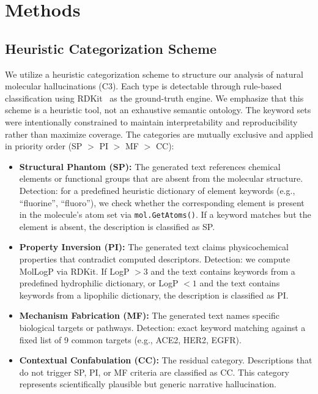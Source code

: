 \section{Methods}
\label{sec:methods}

\subsection{Heuristic Categorization Scheme}
We utilize a heuristic categorization scheme to structure our analysis of natural molecular hallucinations (C3). Each type is detectable through rule-based classification using RDKit~\cite{landrum2023rdkit} as the ground-truth engine. We emphasize that this scheme is a heuristic tool, not an exhaustive semantic ontology. The keyword sets were intentionally constrained to maintain interpretability and reproducibility rather than maximize coverage. The categories are mutually exclusive and applied in priority order (SP $>$ PI $>$ MF $>$ CC):

\begin{itemize}
    \item \textbf{Structural Phantom (SP):} The generated text references chemical elements or functional groups that are absent from the molecular structure. Detection: for a predefined heuristic dictionary of element keywords (e.g., ``fluorine'', ``fluoro''), we check whether the corresponding element is present in the molecule's atom set via \texttt{mol.GetAtoms()}. If a keyword matches but the element is absent, the description is classified as SP.
    \item \textbf{Property Inversion (PI):} The generated text claims physicochemical properties that contradict computed descriptors. Detection: we compute MolLogP via RDKit. If LogP $> 3$ and the text contains keywords from a predefined hydrophilic dictionary, or LogP $< 1$ and the text contains keywords from a lipophilic dictionary, the description is classified as PI.
    \item \textbf{Mechanism Fabrication (MF):} The generated text names specific biological targets or pathways. Detection: exact keyword matching against a fixed list of 9 common targets (e.g., ACE2, HER2, EGFR).
    \item \textbf{Contextual Confabulation (CC):} The residual category. Descriptions that do not trigger SP, PI, or MF criteria are classified as CC. This category represents scientifically plausible but generic narrative hallucination.
\end{itemize}

